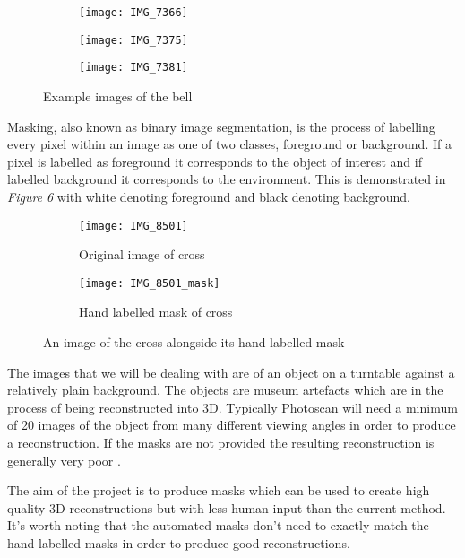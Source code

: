 \documentclass[12pt]{IIBproject}
\begin{document}
\begin{figure}[H]
\centering
\begin{subfigure}{.33\textwidth}
  \centering
  \texttt{[image: IMG\_7366]}
  \label{fig:sub1}
\end{subfigure}%
\begin{subfigure}{.33\textwidth}
  \centering
  \texttt{[image: IMG\_7375]}
  \label{fig:sub2}
\end{subfigure}
\begin{subfigure}{.33\textwidth}
  \centering
  \texttt{[image: IMG\_7381]}
  \label{fig:sub2}
\end{subfigure}
\caption{Example images of the bell}
\label{fig:test}
\end{figure}
Masking, also known as binary image segmentation, is the process of labelling every pixel within an image as one of two classes, foreground or background. If a pixel is labelled as foreground it corresponds to the object of interest and if labelled background it corresponds to the environment. This is demonstrated in \emph{Figure 6} with white denoting foreground and black denoting background. 
\begin{figure}[H]
\centering
\begin{subfigure}{.5\textwidth}
  \centering
  \texttt{[image: IMG\_8501]}
  \caption{Original image of cross}
  \label{fig:sub1}
\end{subfigure}%
\begin{subfigure}{.5\textwidth}
  \centering
  \texttt{[image: IMG\_8501\_mask]}
  \caption{Hand labelled mask of cross}
  \label{fig:sub2}
\end{subfigure}
\caption{An image of the cross alongside its hand labelled mask}
\label{fig:test}
\end{figure}
The images that we will be dealing with are of an object on a turntable against a relatively plain background. The objects are museum artefacts which are in the process of being reconstructed into 3D. Typically Photoscan will need a minimum of 20 images of the object from many different viewing angles in order to produce a reconstruction. If the masks are not provided the resulting reconstruction is generally very poor \cite{photoscanManual}. 

The aim of the project is to produce masks which can be used to create high quality 3D reconstructions but with less human input than the current method. It's worth noting that the automated masks don't need to exactly match the hand labelled masks in order to produce good reconstructions.
\end{document}
